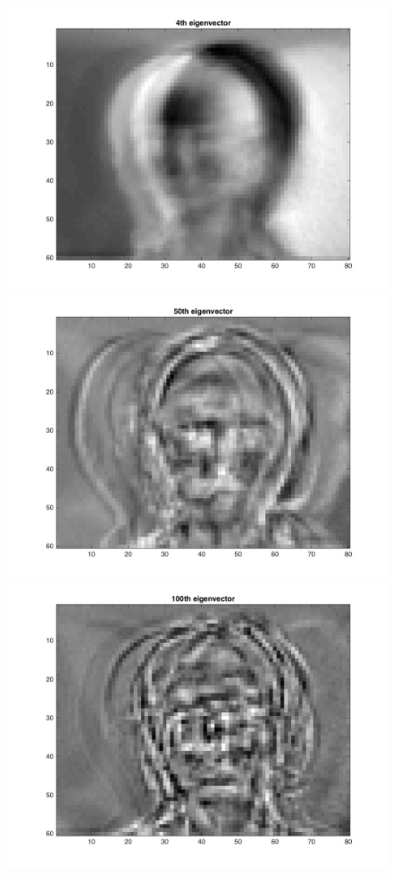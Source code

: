 \documentclass{article}
\begin{document}
\begin{figure}[H]
\includegraphics[scale =.4]{report7_4}
\includegraphics[scale =.4]{report7_5}
\includegraphics[scale =.4]{report7_6}
\end{figure}
\end{document}

